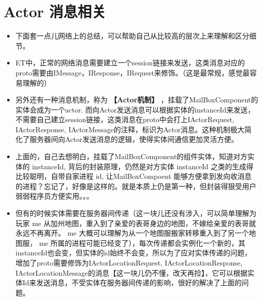 \documentclass[9pt, b5paper]{article}
\begin{document}
\section{Actor 消息相关}
\label{sec-8}
\begin{itemize}
\item 下面套一点儿网络上的总结，可以帮助自己从比较高的层次上来理解和区分细节。
\item ET中，正常的网络消息需要建立一个session链接来发送，这类消息对应的proto需要由IMessage，IResponse，IRequest来修饰。（这是最常规，感觉最容易理解的）
\item 另外还有一种消息机制，称为 \textbf{【Actor机制】} ，挂载了MailBoxComponent的实体会成为一个actor. 而向Actor发送消息可以根据实体的instanceId来发送，不需要自己建立session链接，这类消息在proto中会打上IActorRequest, IActorResponse, IActorMessage的注释，标识为Actor消息。这种机制极大简化了服务器间向Actor发送消息的逻辑，使得实体间通信更加灵活方便。
\item 上面的，自己去想明白，挂载了MailBoxComponent的组件实体，知道对方实体的 instanceId, 背后的封装原理，仍然是对方实体 instanceId 之类的生成得比较聪明，自带自家进程 id, 让MailBoxCompoent 能够方便拿到发向收消息的进程？忘记了，好像是这样的。就是本质上仍是第一种，但封装得狠受用户弱弱程序员方便实用。。。
\item 但有的时候实体需要在服务器间传递（这一块儿还没有涉入，可以简单理解为玩家 me 从加州地图，重入到了亲爱的表哥身边的地图，不嫁给亲爱的表哥就永远不再离开。 me 大概可以理解为从一个地图服搬家转移重入到了另一个地图服， me 所属的进程可能已经变了），每次传递都会实例化一个新的，其instanceId也会变，但实体的id始终不会变，所以为了应对实体传递的问题，增加了proto需要修饰为IActorLocationRequest, IActorLocationResponse, IActorLocationMessage的消息【这一块儿仍不懂，改天再捡】，它可以根据实体Id来发送消息，不受实体在服务器间传递的影响，很好的解决了上面的问题。
\end{itemize}
\end{document}
